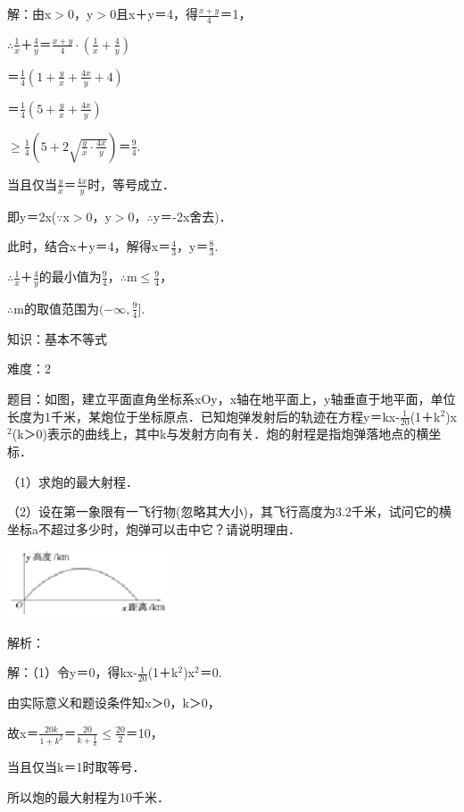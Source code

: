 \documentclass{article} %
\begin{document}
解：由x$\mathrm{>}$0，y$\mathrm{>}$0且x＋y＝4，得$\frac{x+y}{4}$＝1，

$\mathrm{\therefore}$$\frac{1}{x}$＋$\frac{4}{y}$＝$\frac{x+y}{4}\cdot(\frac{1}{x}+\frac{4}{y})$

＝$\frac{1}{4}(1+\frac{y}{x}+\frac{4x}{y}+4)$

＝$\frac{1}{4}(5+\frac{y}{x}+\frac{4x}{y})$

$\mathrm{\ge}$$\frac{1}{4}(5+2\sqrt{\frac{y}{x}\cdot\frac{4x}{y}})$＝$\frac{9}{4}$.

当且仅当$\frac{y}{x}$＝$\frac{4x}{y}$时，等号成立．

即y＝2x($\mathrm{\because}$x$\mathrm{>}$0，y$\mathrm{>}$0，$\mathrm{\therefore}$y＝-2x舍去)．

此时，结合x＋y＝4，解得x＝$\frac{4}{3}$，y＝$\frac{8}{3}$.

$\mathrm{\therefore}$$\frac{1}{x}$＋$\frac{4}{y}$的最小值为$\frac{9}{4}$，$\mathrm{\therefore}$m$\mathrm{\le}$$\frac{9}{4}$，

$\mathrm{\therefore}$m的取值范围为$(-\infty,\frac{9}{4}]$.



知识：基本不等式

难度：2

题目：如图，建立平面直角坐标系xOy，x轴在地平面上，y轴垂直于地平面，单位长度为1千米，某炮位于坐标原点．已知炮弹发射后的轨迹在方程y＝kx-$\frac{1}{20}$(1＋k${}^{2}$)x${}^{2}$(k＞0)表示的曲线上，其中k与发射方向有关．炮的射程是指炮弹落地点的横坐标．

（1）求炮的最大射程．

（2）设在第一象限有一飞行物(忽略其大小)，其飞行高度为3.2千米，试问它的横坐标a不超过多少时，炮弹可以击中它？请说明理由．

\includegraphics*[width=1.89in, height=0.78in, keepaspectratio=false]{image1}

解析：

解：（1）令y＝0，得kx-$\frac{1}{20}$(1＋k${}^{2}$)x${}^{2}$＝0.

由实际意义和题设条件知x＞0，k＞0，

故x＝$\frac{20k}{1+k^2}$＝$\frac{20}{k+\frac{1}{k}}$$\mathrm{\le}$$\frac{20}{2}$＝10，

当且仅当k＝1时取等号．

所以炮的最大射程为10千米．
\end{document}

